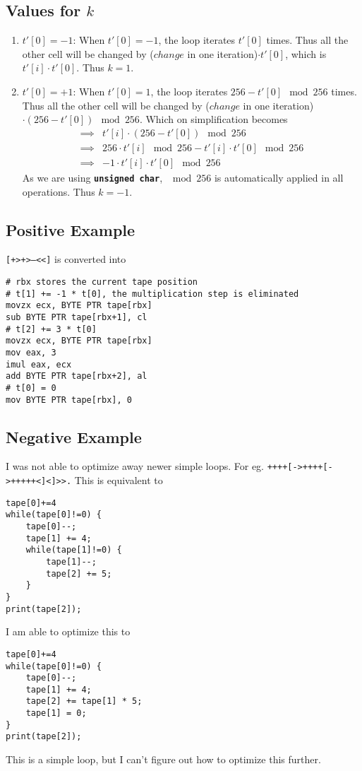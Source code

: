 \documentclass[11pt,answers]{exam}
\begin{document}
\subsection{Values for $k$}
\begin{enumerate}
	\item $t'[0] = -1$: When $t'[0] = -1$, the loop iterates $t'[0]$ times. Thus all the other cell will be changed by ($change$ in one iteration)$ \cdot t'[0]$, which is $t'[i] \cdot t'[0]$. Thus $k = 1$.
	\item $t'[0] = +1$: When $t'[0] = 1$, the loop iterates $256 - t'[0] \mod 256$ times. Thus all the other cell will be changed by ($change$ in one iteration)$ \cdot (256 - t'[0]) \mod 256$. Which on simplification becomes
	      \begin{align*}
		      \implies & t'[i] \cdot (256 - t'[0])\mod 256                   \\
		      \implies & 256 \cdot t'[i]\mod 256 - t'[i] \cdot t'[0]\mod 256 \\
		      \implies & -1 \cdot t'[i] \cdot t'[0]\mod 256
	      \end{align*}
	      As we are using \texttt{\textbf{unsigned char}}, $\mod 256$ is automatically applied in all operations. Thus $k = -1$.
\end{enumerate}

\subsection{Positive Example}
\texttt{[+>+>---<<]} is converted into
	{\renewcommand\fcolorbox[4][]{\textcolor{cyan}{\strut#4}}
		\begin{verbatim}
# rbx stores the current tape position
# t[1] += -1 * t[0], the multiplication step is eliminated
movzx ecx, BYTE PTR tape[rbx]
sub BYTE PTR tape[rbx+1], cl
# t[2] += 3 * t[0]
movzx ecx, BYTE PTR tape[rbx]
mov eax, 3
imul eax, ecx
add BYTE PTR tape[rbx+2], al
# t[0] = 0
mov BYTE PTR tape[rbx], 0
\end{verbatim}
	}

\subsection{Negative Example}
I was not able to optimize away newer simple loops.
For eg. \texttt{++++[->++++[->+++++<]<]>>.}
This is equivalent to
\begin{verbatim}
tape[0]+=4
while(tape[0]!=0) {
	tape[0]--;
	tape[1] += 4;
	while(tape[1]!=0) {
		tape[1]--;
		tape[2] += 5;
	}
}
print(tape[2]);
\end{verbatim}
I am able to optimize this to
\begin{verbatim}
tape[0]+=4
while(tape[0]!=0) {
	tape[0]--;
	tape[1] += 4;
	tape[2] += tape[1] * 5;
	tape[1] = 0;
}
print(tape[2]);
\end{verbatim}
This is a simple loop, but I can't figure out how to optimize this further.
\end{document}

